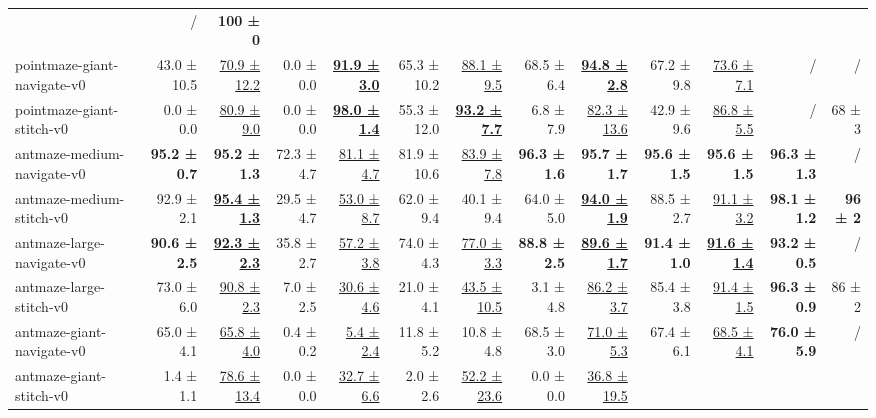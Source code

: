 \documentclass{article} %
\begin{document}
\begin{table}[ht]
\begin{tabular*}{\linewidth}{@{\extracolsep{\fill}} l 
    r r  %
    r r  %
    r r  %
    r r  %
    r r  %
    r    %
    r    %
}
  & / & \textbf{100 ± 0} \\
pointmaze-giant-navigate-v0  
& 43.0 ± 10.5 & \underline{70.9 ± 12.2} 
& 0.0 ± 0.0 & \underline{\textbf{91.9 ± 3.0}} 
& 65.3 ± 10.2 & \underline{88.1 ± 9.5} 
& 68.5 ± 6.4 & \textbf{\underline{94.8 ± 2.8}} 
& 67.2 ± 9.8  & \underline{73.6 ± 7.1}
& / & / \\
pointmaze-giant-stitch-v0    
& 0.0 ± 0.0   & \underline{80.9 ± 9.0} 
& 0.0 ± 0.0 & \underline{\textbf{98.0 ± 1.4}} 
& 55.3 ± 12.0 & \underline{\textbf{93.2 ± 7.7}} 
& 6.8 ± 7.9 & \underline{82.3 ± 13.6} 
& 42.9 ± 9.6 & \underline{86.8 ± 5.5}
& / & 68 ± 3 \\
\midrule
antmaze-medium-navigate-v0
  & \textbf{95.2 ± 0.7} & \textbf{95.2 ± 1.3}
  & 72.3 ± 4.7          & \underline{81.1 ± 4.7}
  & 81.9 ± 10.6         & \underline{83.9 ± 7.8}
  & \textbf{96.3 ± 1.6} & \textbf{95.7 ± 1.7} 
  & \textbf{95.6 ± 1.5} & \textbf{95.6 ± 1.5}
  & \textbf{96.3 ± 1.3} & / \\
antmaze-medium-stitch-v0
  & 92.9 ± 2.1 & \underline{\textbf{95.4 ± 1.3}}
  & 29.5 ± 4.7          & \underline{53.0 ± 8.7}
  & 62.0 ± 9.4          & 40.1 ± 9.4
  & 64.0 ± 5.0          & \underline{\textbf{94.0 ± 1.9}} 
  & 88.5 ± 2.7          & \underline{91.1 ± 3.2}
  & \textbf{98.1 ± 1.2} & \textbf{96 ± 2} \\
antmaze-large-navigate-v0
  & \textbf{90.6 ± 2.5} & \underline{\textbf{92.3 ± 2.3}}
  & 35.8 ± 2.7          & \underline{57.2 ± 3.8}
  & 74.0 ± 4.3          & \underline{77.0 ± 3.3}
  & \textbf{88.8 ± 2.5} & \underline{\textbf{89.6 ± 1.7}} 
  & \textbf{91.4 ± 1.0 }         & \underline{\textbf{91.6 ± 1.4}}
  & \textbf{93.2 ± 0.5} & / \\
antmaze-large-stitch-v0
  & 73.0 ± 6.0          & \underline{90.8 ± 2.3}
  & 7.0 ± 2.5           & \underline{30.6 ± 4.6}
  & 21.0 ± 4.1          & \underline{43.5 ± 10.5}
  & 3.1 ± 4.8           & \underline{86.2 ± 3.7} 
  & 85.4 ± 3.8          & \underline{91.4 ± 1.5}
  & \textbf{96.3 ± 0.9} & 86 ± 2 \\
antmaze-giant-navigate-v0    
& 65.0 ± 4.1  & \underline{65.8 ± 4.0} 
& 0.4 ± 0.2 & \underline{5.4 ± 2.4}           
& 11.8 ± 5.2  & 10.8 ± 4.8                   
& 68.5 ± 3.0 & \underline{71.0 ± 5.3} 
& 67.4 ± 6.1     & \underline{68.5 ± 4.1}
& \textbf{76.0 ± 5.9} & / \\
antmaze-giant-stitch-v0      
& 1.4 ± 1.1   & \underline{78.6 ± 13.4} 
& 0.0 ± 0.0 & \underline{32.7 ± 6.6}          
& 2.0 ± 2.6   & \underline{52.2 ± 23.6}      
& 0.0 ± 0.0 & \underline{36.8 ± 19.5} 

\end{tabular*}
\end{table}
\end{document}
